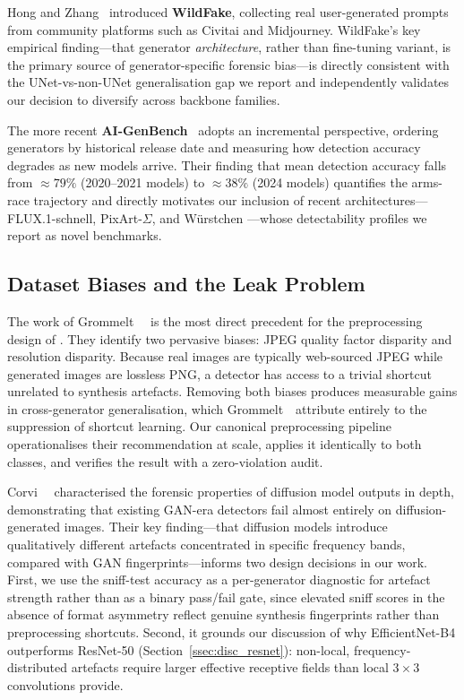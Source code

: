 Hong and Zhang~\cite{hong2024wildfake} introduced \textbf{WildFake},
collecting real user-generated prompts from community platforms such
as Civitai and Midjourney.
WildFake's key empirical finding---that generator \emph{architecture},
rather than fine-tuning variant, is the primary source of
generator-specific forensic bias---is directly consistent with the
UNet-vs-non-UNet generalisation gap we report and independently
validates our decision to diversify across backbone families.

The more recent \textbf{AI-GenBench}~\cite{pellegrini2025aigenbench}
adopts an incremental perspective, ordering generators by historical
release date and measuring how detection accuracy degrades as new
models arrive.
Their finding that mean detection accuracy falls from $\approx 79\%$
(2020--2021 models) to $\approx 38\%$ (2024 models) quantifies the
arms-race trajectory and directly motivates our inclusion of recent
architectures---FLUX.1-schnell, PixArt-$\Sigma$, and W\"{u}rstchen
---whose detectability profiles we report as novel benchmarks.

\subsection{Dataset Biases and the Leak Problem}
\label{ssec:bias}

The work of Grommelt~\etal~\cite{grommelt2024jpeg} is the most
direct precedent for the preprocessing design of \textbf{\datasetname}.
They identify two pervasive biases: JPEG quality factor disparity
and resolution disparity.
Because real images are typically web-sourced JPEG while generated
images are lossless PNG, a detector has access to a trivial shortcut
unrelated to synthesis artefacts.
Removing both biases produces measurable gains in cross-generator
generalisation, which Grommelt~\etal\ attribute entirely to the
suppression of shortcut learning.
Our canonical preprocessing pipeline operationalises their
recommendation at scale, applies it identically to both classes,
and verifies the result with a zero-violation audit.

Corvi~\etal~\cite{corvi2023detection} characterised the forensic
properties of diffusion model outputs in depth, demonstrating that
existing GAN-era detectors fail almost entirely on diffusion-generated
images.
Their key finding---that diffusion models introduce qualitatively
different artefacts concentrated in specific frequency bands,
compared with GAN fingerprints---informs two design decisions in
our work.
First, we use the sniff-test accuracy as a per-generator diagnostic
for artefact strength rather than as a binary pass/fail gate, since
elevated sniff scores in the absence of format asymmetry reflect
genuine synthesis fingerprints rather than preprocessing shortcuts.
Second, it grounds our discussion of why EfficientNet-B4 outperforms
ResNet-50 (Section~\ref{ssec:disc_resnet}): non-local,
frequency-distributed artefacts require larger effective receptive
fields than local $3\times 3$ convolutions provide.

